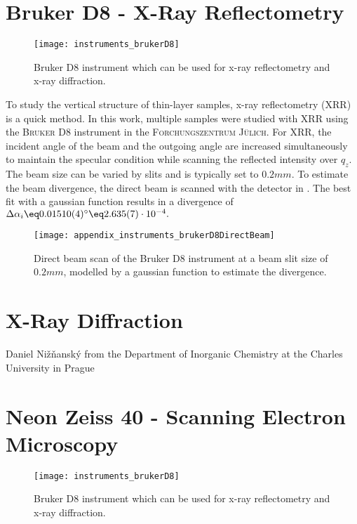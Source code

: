 \documentclass[\main/dresen_thesis.tex]{subfiles}
\begin{document}
\section{Bruker D8 - X-Ray Reflectometry}
\label{app:additionalExperimentalTechniques:xrr}
\begin{figure}[h]
  \centering
  \texttt{[image: instruments\_brukerD8]}
  \caption{\label{fig:appendix:instruments:brukerD8}Bruker D8 instrument which can be used for x-ray reflectometry and x-ray diffraction.}
\end{figure}
To study the vertical structure of thin-layer samples, x-ray reflectometry (XRR) is a quick method. In this work, multiple samples were studied with XRR using the \textsc{Bruker D8} instrument in the \textsc{Forchungszentrum J\"ulich}.
For XRR, the incident angle of the beam and the outgoing angle are increased simultaneously to maintain the specular condition while scanning the reflected intensity over $q_z$.
The beam size can be varied by slits and is typically set to $0.2 \unit{mm}$.
To estimate the beam divergence, the direct beam is scanned with the detector in .
The best fit with a gaussian function results in a divergence of $\Delta \alpha_i \eq 0.01510(4) ^\circ \eq 2.635(7) \cdot 10^{-4}.$
\begin{figure}[h]
  \centering
  \texttt{[image: appendix\_instruments\_brukerD8DirectBeam]}
  \caption{\label{fig:appendix:instruments:brukerD8DirectBeam}Direct beam scan of the Bruker D8 instrument at a beam slit size of $0.2 \unit{mm}$, modelled by a gaussian function to estimate the divergence.}
\end{figure}

\section{X-Ray Diffraction}
\label{app:additionalExperimentalTechniques:xrd}
Daniel Nižňanský from the Department of Inorganic Chemistry at the Charles University in Prague

\section{Neon Zeiss 40 - Scanning Electron Microscopy}
\label{app:additionalExperimentalTechniques:sem}
\begin{figure}[h]
  \centering
  \texttt{[image: instruments\_brukerD8]}
  \caption{\label{fig:appendix:instruments:brukerD8}Bruker D8 instrument which can be used for x-ray reflectometry and x-ray diffraction.}
\end{figure}
\end{document}
